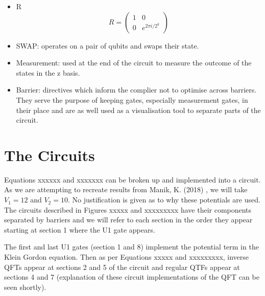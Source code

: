 \documentclass{article}
\begin{document}
\begin{itemize}[labelindent=1.5em,labelsep=0.9cm,leftmargin=*]
	\item R
	\[R = \left(\begin{array}{cc}{1} & {0} \\ {0} & {e^{2 \pi i / 2^{k}}}\end{array}\right)\]
	\item{} {} {} {} {}  SWAP: operates on a pair of qubits and swaps their state.
    \item{} {} {} {} {} Measurement: used at the end of the circuit to measure the outcome of the states in the z basis.
    \item{} {} {} {} {} Barrier: directives which inform the complier not to optimise across barriers. They serve the purpose of keeping gates, especially measurement gates, in their place and are as well used as a visualisation tool to separate parts of the circuit.
\end{itemize}


\section{The Circuits}
Equations xxxxxx and xxxxxxx can be broken up and implemented into a circuit. As we are attempting to recreate results from Manik, K. (2018) \cite{manik}, we will take $V_1 = 12$ and $V_2 = 10$. No justification is given as to why these potentials are used. The circuits described in Figures xxxxx and xxxxxxxxx have their components separated by barriers and we will refer to each section in the order they appear starting at section 1 where the U1 gate appears. 

The first and last U1 gates (section 1 and 8) implement the potential term in the Klein Gordon equation. Then as per Equations xxxxx and xxxxxxxxx, inverse QFTs appear at sections 2 and 5 of the circuit and regular QTFs appear at sections 4 and 7 (explanation of these circuit implementations of the QFT can be seen shortly).
\end{document}
